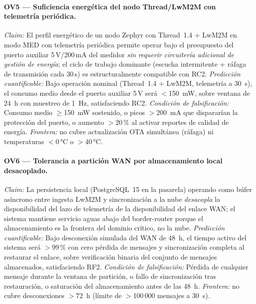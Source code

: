 \paragraph{OV5 --- Suficiencia energética del nodo Thread/LwM2M con telemetría periódica.}
\emph{Claim:} El perfil energético de un nodo Zephyr con Thread~1.4 + LwM2M en modo MED con telemetría periódica permite operar bajo el presupuesto del puerto auxiliar 5\,V/200\,mA del medidor \emph{sin requerir circuitería adicional de gestión de energía}; el ciclo de trabajo dominante (escucha intermitente + ráfaga de transmisión cada 30\,s) es estructuralmente compatible con RC2.
\emph{Predicción cuantificable:} Bajo operación nominal (Thread~1.4 + LwM2M, telemetría a 30~s), el consumo medio desde el puerto auxiliar 5\,V será $<$150~mW, sobre ventana de 24~h con muestreo de 1~Hz, satisfaciendo RC2.
\emph{Condición de falsificación:} Consumo medio $\geq$150~mW sostenido, o picos $>$200~mA que dispararían la protección del puerto, o aumento $>$20\,\% al activar reportes de calidad de energía. \emph{Frontera:} no cubre actualización OTA simultánea (ráfaga) ni temperaturas $<$0\,°C o $>$40\,°C.

\paragraph{OV6 --- Tolerancia a partición WAN por almacenamiento local desacoplado.}
\emph{Claim:} La persistencia local (PostgreSQL~15 en la pasarela) operando como búfer asíncrono entre ingesta LwM2M y sincronización a la nube \emph{desacopla} la disponibilidad del lazo de telemetría de la disponibilidad del enlace WAN; el sistema mantiene servicio aguas abajo del border-router porque el almacenamiento es la frontera del dominio crítico, no la nube.
\emph{Predicción cuantificable:} Bajo desconexión simulada del WAN de 48~h, el tiempo activo del sistema será $>$99\,\% con cero pérdida de mensajes y sincronización completa al restaurar el enlace, sobre verificación binaria del conjunto de mensajes almacenados, satisfaciendo RF2.
\emph{Condición de falsificación:} Pérdida de cualquier mensaje durante la ventana de partición, o fallo de sincronización tras restauración, o saturación del almacenamiento antes de las 48~h. \emph{Frontera:} no cubre desconexiones $>$72~h (límite de $>$100\,000 mensajes a 30~s).

